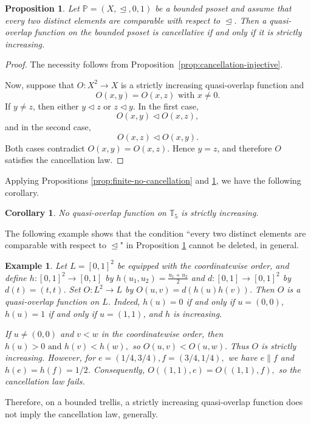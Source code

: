\documentclass[preprint,12pt]{elsarticle}
\newtheorem{proposition}[theorem]{Proposition}
\newtheorem{corollary}[theorem]{Corollary}
\newtheorem{example}[theorem]{Example}
\begin{document}
\begin{proposition}\label{prop:complete-strict-cancel}
Let $\mathbb{P}=(X,\trianglelefteq,0,1)$ be a bounded psoset and assume that every two distinct elements are comparable with respect to $\trianglelefteq$. Then a quasi-overlap function on the bounded psoset is cancellative if and only if it is strictly increasing.
\end{proposition}

\begin{proof}
The necessity follows from Proposition~\ref{prop:cancellation-injective}.

Now, suppose that $O: X^2\to X$ is a strictly increasing quasi-overlap function and
$$
 O(x,y)=O(x,z)\mbox{ with }x\neq 0.
$$
 If $y\neq z$, then either $y\triangleleft z$ or $z\triangleleft y$. In the first case,
$$
 O(x,y)\triangleleft O(x,z),
$$
and in the second case,
$$
 O(x,z)\triangleleft O(x,y).
$$
Both cases contradict $O(x,y)=O(x,z)$. Hence $y=z$, and therefore $O$ satisfies the cancellation law.
\end{proof}

Applying Propositions \ref{prop:finite-no-cancellation} and \ref{prop:complete-strict-cancel}, we have the following corollary.
\begin{corollary}
No quasi-overlap function on $\mathbb{T}_5$ is strictly increasing.
\end{corollary}

The following example shows that the condition ``every two distinct elements are comparable with respect to $\trianglelefteq$" in Proposition \ref{prop:complete-strict-cancel} cannot be deleted, in general.
\begin{example}\label{ex:strict-not-cancel}
\upshape
Let $L=[0,1]^2$ be equipped with the coordinatewise order, and define $h: [0,1]^2\to [0,1]$ by $h(u_1,u_2)=\frac{u_1+u_2}{2}$ and $d:[0,1]\to [0,1]^2$ by $d(t)=(t,t)$. Set $O: L^2\to L$ by $O(u,v)=d(h(u)h(v))$. Then $O$ is a quasi-overlap function on $L$. Indeed, $h(u)=0$ if and only if $u=(0,0)$, $h(u)=1$ if and only if $u=(1,1)$, and $h$ is increasing.

If $u\neq(0,0)$ and $v<w$ in the coordinatewise order, then
$
 h(u)>0
 \mbox{ and }
 h(v)<h(w),
$
so
$
 O(u,v)<O(u,w).
$
Thus $O$ is strictly increasing. However, for
$
 e=(1/4,3/4),
 f=(3/4,1/4),
$
we have $e\parallel f$ and $h(e)=h(f)=1/2$. Consequently,
$
 O((1,1),e)=O((1,1),f),
$
so the cancellation law fails.
\end{example}

Therefore, on a bounded trellis, a strictly increasing quasi-overlap function does not imply the cancellation law, generally.
\end{document}

